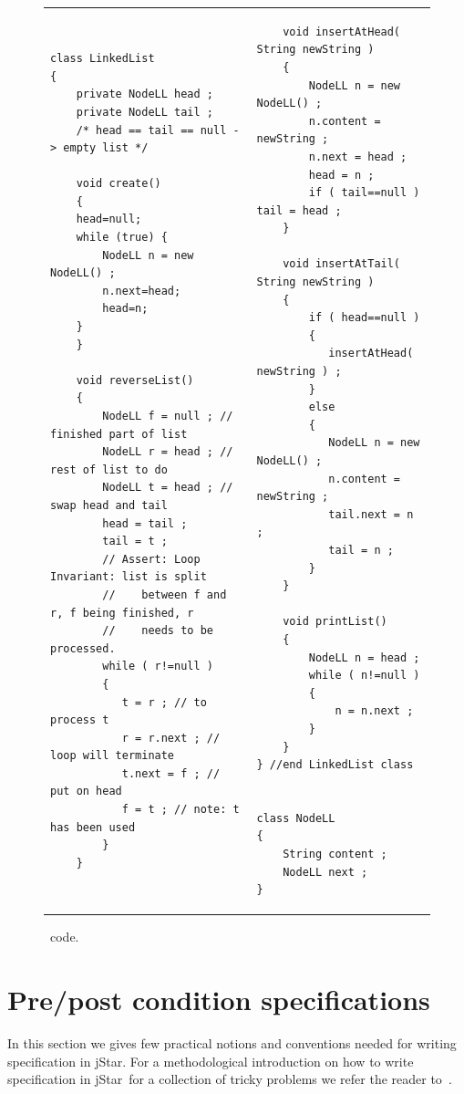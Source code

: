 \documentclass[11pt]{article}
\newcommand{\jStar}{{\sf jStar}}
\begin{document}
%
\begin{figure}[t]
  \centering
  \begin{tabular}{l|l}
    \begin{lstlisting}
class LinkedList
{
    private NodeLL head ;
    private NodeLL tail ;
    /* head == tail == null -> empty list */

    void create()
    {
	head=null;
	while (true) {
	    NodeLL n = new NodeLL() ;
	    n.next=head;
	    head=n;
	}
    }
    
    void reverseList()
    {
        NodeLL f = null ; // finished part of list
        NodeLL r = head ; // rest of list to do
        NodeLL t = head ; // swap head and tail
        head = tail ;
        tail = t ;
        // Assert: Loop Invariant: list is split
        //    between f and r, f being finished, r
        //    needs to be processed.
        while ( r!=null )
        {
           t = r ; // to process t
           r = r.next ; // loop will terminate 
           t.next = f ; // put on head
           f = t ; // note: t has been used
        }
    }
\end{lstlisting}
& \qquad \quad
\begin{lstlisting}            
    void insertAtHead( String newString )
    {
        NodeLL n = new NodeLL() ;
        n.content = newString ;
        n.next = head ;
        head = n ;
        if ( tail==null ) tail = head ;
    }

    void insertAtTail( String newString )
    {
        if ( head==null )
        {
           insertAtHead( newString ) ;
        }
        else
        {
           NodeLL n = new NodeLL() ;
           n.content = newString ;
           tail.next = n ;
           tail = n ;
        }
    }
    
    void printList()
    {
        NodeLL n = head ;
        while ( n!=null )
        {
            n = n.next ;
        }
    }    
} //end LinkedList class


class NodeLL
{
    String content ;
    NodeLL next ;
}
\end{lstlisting}
  \end{tabular}
  \caption{\linkedlist \ code.}
  \label{tab:linkedlist}
\end{figure}


\section{Pre/post condition specifications}
\label{sec:pre/post}
In this section we gives few practical notions and conventions needed
for writing specification in \jStar. For a methodological introduction
on how to write specification in \jStar \ for a collection of tricky
problems we refer the reader to~\cite{jstar}.
\end{document}
